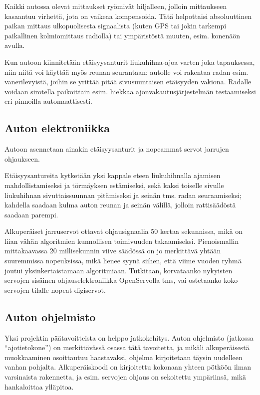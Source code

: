 \documentclass{article}
\begin{document}
Kaikki autossa olevat mittaukset ryömivät hiljalleen, jolloin mittaukseen kasaantuu virhettä, jota on vaikeaa kompensoida. Tätä helpottaisi absoluuttinen paikan mittaus ulkopuolisesta signaalista (kuten GPS tai jokin tarkempi paikallinen kolmiomittaus radiolla) tai ympäristöstä muuten, esim. konenäön avulla.

Kun autoon kiinnitetään etäisyysanturit liukuhihna-ajoa varten joka tapauksessa, niin niitä voi käyttää myös reunan seurantaan: autolle voi rakentaa radan esim. vanerilevyistä, joihin se yrittää pitää sivusuuntaisen etäisyyden vakiona. Radalle voidaan sirotella paikoittain esim. hiekkaa ajonvakautusjärjestelmän testaamiseksi eri pinnoilla automaattisesti.

\subsection{Auton elektroniikka}

Autoon asennetaan ainakin etäisyysanturit ja nopeammat servot jarrujen ohjaukseen.

Etäisyysantureita kytketään yksi kappale eteen liukuhihnalla ajamisen mahdollistamiseksi ja törmäyksen estämiseksi, sekä kaksi toiselle sivulle liukuhihnan sivuttaissuunnan pitämiseksi ja seinän tms. radan seuraamiseksi; kahdella saadaan kulma auton reunan ja seinän välillä, jolloin rattisäädöstä saadaan parempi.

Alkuperäiset jarruservot ottavat ohjausignaalia 50 kertaa sekunnissa, mikä on liian vähän algoritmien kunnollisen toimivuuden takaamiseksi. Pienoismallin mittakaavassa 20 millisekunnin viive säädössä on jo merkittävä yhtään suuremmissa nopeuksissa, mikä lienee syynä siihen, että viime vuoden ryhmä joutui yksinkertaistamaan algoritmiaan. Tutkitaan, korvataanko nykyisten servojen sisäinen ohjauselektroniikka OpenServolla tms, vai ostetaanko koko servojen tilalle nopeat digiservot.

\subsection{Auton ohjelmisto}

Yksi projektin päätavoitteista on helppo jatkokehitys. Auton ohjelmisto (jatkossa “ajotietokone”) on merkittävässä osassa tätä tavoitetta, ja mikäli alkuperäisestä muokkaaminen osoittautuu haastavaksi, ohjelma kirjoitetaan täysin uudelleen vanhan pohjalta. Alkuperäiskoodi on kirjoitettu kokonaan yhteen pötköön ilman varsinaista rakennetta, ja esim. servojen ohjaus on sekoitettu ympäriinsä, mikä hankaloittaa ylläpitoa.
\end{document}
